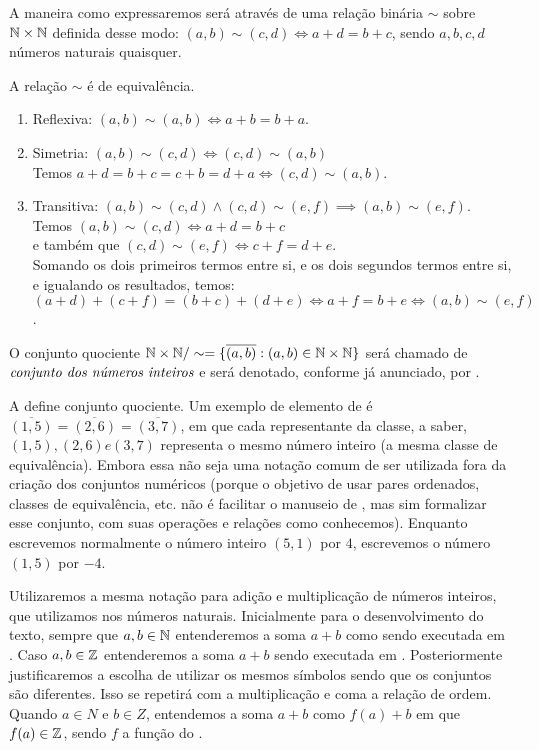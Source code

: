 \documentclass[../main.tex]{subfiles}
\begin{document}
A maneira como expressaremos será através de uma relação binária $\sim$ sobre $\mathbb{N} \times \mathbb{N}$ definida desse modo: $(a,b) \sim (c,d) \iff a+d = b+c$, sendo $a,b,c,d$ números naturais quaisquer.
\begin{teo}
    A relação $\sim$ é de equivalência.
\end{teo}
\begin{dem}
    \begin{enumerate}[label=(\roman*)]
        \item Reflexiva: $(a,b) \sim (a,b) \iff a+b=b+a$.
        \item Simetria: $(a,b) \sim (c,d) \iff (c,d) \sim (a,b)$ \\
        Temos $ a+d = b+c = c+b = d+a \iff (c,d) \sim (a,b)$.
        \item Transitiva: $(a,b) \sim (c,d) \land (c,d) \sim (e,f) \implies (a,b) \sim (e,f)$. \\
        Temos $(a,b) \sim (c,d) \iff a+d=b+c$ \\
        e também que $(c,d) \sim (e,f) \iff c+f=d+e$. \\
        Somando os dois primeiros termos entre si, e os dois segundos termos entre si, e igualando os resultados, temos: \\ 
        $(a+d)+(c+f)= (b+c)+(d+e) \iff a+f = b+e \iff (a,b) \sim (e,f)$.
    \end{enumerate}
\end{dem}
\begin{defi}\label{int-def-conjNum}
    O conjunto quociente $\mathbb{N} \times \mathbb{N} / \sim = \{ \overline{(a,b)}: (a,b) \in \mathbb{N} \times \mathbb{N}\}$ será chamado de $\emph{conjunto dos números inteiros}$ e será denotado, conforme já anunciado, por \Z.
\end{defi}
A  define conjunto quociente. Um exemplo de elemento de \Z é $\overline{(1,5)} = \overline{(2,6)} = \overline{(3,7)}$, em que cada representante da classe, a saber, $(1,5), (2,6) e (3,7)$ representa o mesmo número inteiro (a mesma classe de equivalência). Embora essa não seja uma notação comum de ser utilizada fora da criação dos conjuntos numéricos (porque o objetivo de usar pares ordenados, classes de equivalência, etc. não é facilitar o manuseio de \Z, mas sim formalizar esse conjunto, com suas operações e relações como conhecemos). Enquanto escrevemos normalmente o número inteiro $(5,1)$ por $4$, escrevemos o número $(1,5)$ por $-4$.

\begin{obs}
    Utilizaremos a mesma notação para adição e multiplicação de números inteiros, que utilizamos nos números naturais. Inicialmente para o desenvolvimento do texto, sempre que $a,b \in \mathbb{N}$ entenderemos a soma $a+b$ como sendo executada em \N. Caso $a,b \in \mathbb{Z}$ entenderemos a soma $a+b$ sendo executada em \Z. Posteriormente justificaremos a escolha de utilizar os mesmos símbolos sendo que os conjuntos são diferentes. Isso se repetirá com a multiplicação e coma a relação de ordem. Quando $a \in N$ e $b \in Z$, entendemos a soma $a + b$ como $f(a) + b$ em que $f(a) \in \mathbb{Z}$, sendo $f$ a função do .
\end{obs}
\end{document}
